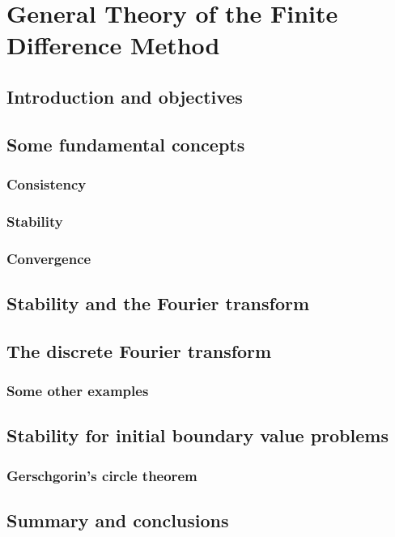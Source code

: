 \chapter{General Theory of the Finite Difference Method}

\section{Introduction and objectives}

\section{Some fundamental concepts}

\subsection{Consistency}

\subsection{Stability}

\subsection{Convergence}

\section{Stability and the Fourier transform}

\section{The discrete Fourier transform}

\subsection{Some other examples}

\section{Stability for initial boundary value problems}

\subsection{Gerschgorin’s circle theorem}

\section{Summary and conclusions}